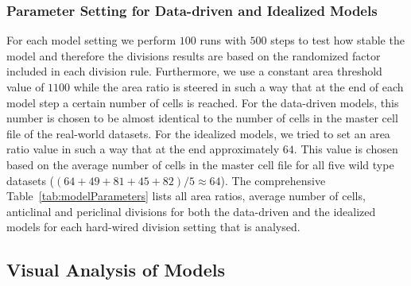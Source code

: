 \documentclass[11pt,a4paper, final]{article}
\begin{document}
\subsubsection{Parameter Setting for Data-driven and Idealized Models}
\noindent
For each model setting we perform $100$ runs with $500$ steps to test how stable the model and therefore the divisions results are based on the randomized factor included in each division rule. Furthermore, we use a constant area threshold value of $1100$ while the area ratio is steered in such a way that at the end of each model step a certain number of cells is reached. For the data-driven models, this number is chosen to be almost identical to the number of cells in the master cell file of the real-world datasets. For the idealized models, we tried to set an area ratio value in such a way that at the end approximately $64$. This value is chosen based on the average number of cells in the master cell file for all five wild type datasets ($(64+49+81+45+82)/5 \approx 64$). The comprehensive Table~\ref{tab:modelParameters} lists all area ratios, average number of cells, anticlinal and periclinal divisions for both the data-driven and the idealized models for each hard-wired division setting that is analysed.

\subsection{Visual Analysis of Models}
\end{document}
